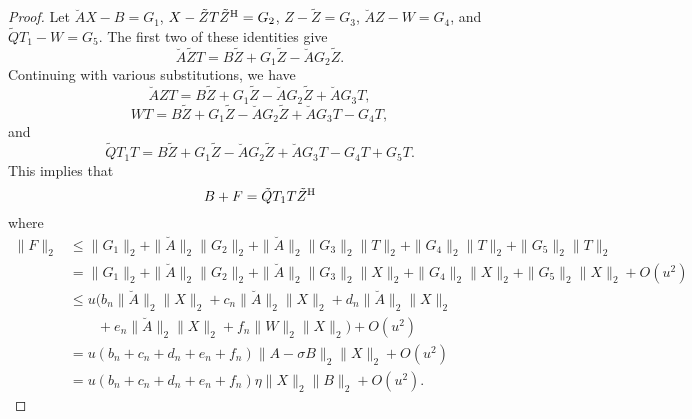\documentclass[12pt]{article}
\def\H{{\rm H}}
\begin{document}
\begin{proof}
  Let $\breve{A} X - B = G_1$, $X - \tilde{Z}T \tilde{Z}^\H = G_2$,
  $Z - \tilde{Z} = G_3$, $\breve{A}Z - W = G_4$, and
  $\tilde{Q}T_1 - W = G_5$.  The first two of these identities give
  \begin{equation*}
    \breve{A} \tilde{Z} T = B\tilde{Z} + G_1 \tilde{Z} - \breve{A}G_2 \tilde{Z}.
  \end{equation*}
  Continuing with various substitutions, we have
  \begin{equation*}
    \breve{A} Z T = B\tilde{Z} + G_1 \tilde{Z} - \breve{A}G_2 \tilde{Z} + \breve{A} G_3 T,
  \end{equation*}
  \begin{equation*}
    W T = B\tilde{Z} + G_1 \tilde{Z} - \breve{A}G_2 \tilde{Z} + \breve{A} G_3 T - G_4 T,
  \end{equation*}
  and
  \begin{equation*}
    \tilde{Q} T_1 T = B\tilde{Z} + G_1 \tilde{Z} - \breve{A}G_2 \tilde{Z} + \breve{A} G_3 T - G_4 T + G_5 T.
  \end{equation*}
  This implies that
  \begin{equation*}
    B + F = \tilde{Q} T_1 T \tilde{Z}^\H
  \end{equation*}
  where
  \begin{align*}
    \|F\|_2
    & \leq \|G_1\|_2 + \|\breve{A}\|_2 \|G_2\|_2 + \|\breve{A}\|_2 \|G_3\|_2 \|T\|_2 +
      \|G_4\|_2 \|T\|_2 + \|G_5\|_2 \|T\|_2 \\
    & = \|G_1\|_2 + \|\breve{A}\|_2 \|G_2\|_2 + \|\breve{A}\|_2 \|G_3\|_2 \|X\|_2 +
      \|G_4\|_2 \|X\|_2 + \|G_5\|_2 \|X\|_2  + O(u^2) \\
    & \leq u ( b_n \|\breve{A}\|_2 \|X\|_2 + c_n \|\breve{A}\|_2 \|X\|_2 + d_n \|\breve{A}\|_2 \|X\|_2\\
    & \qquad + e_n \|\breve{A}\|_2 \|X\|_2 + f_n \|W\|_2 \|X\|_2) +O(u^2) \\
    & = u \left( b_n + c_n +d_n +e_n + f_n\right) \|A-\sigma B\|_2 \|X\|_2 + O(u^2) \\
    & = u \left( b_n + c_n +d_n +e_n + f_n\right) \eta \|X\|_2 \|B\|_2 + O(u^2).
  \end{align*}
  

\end{proof}
\end{document}
